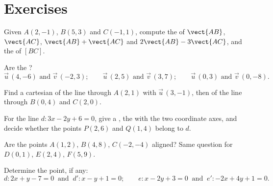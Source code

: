 \section{Exercises}

\begin{exercise}[$\star$]\label{exo:g11:vect:1}
Given $A(2, -1)$, $B(5, 3)$ and $C(-1, 1)$, compute the  of
$\vect{AB}$, $\vect{AC}$, $\vect{AB} + \vect{AC}$ and $2\vect{AB} -
3\vect{AC}$, and the  of $[BC]$.
\end{exercise}

\begin{exercise}[$\star$]\label{exo:g11:vect:2}
Are the  ?
\[
\vec u\,(4, -6) \text{ and } \vec v\,(-2, 3); \qquad
\vec u\,(2, 5) \text{ and } \vec v\,(3, 7); \qquad
\vec u\,(0, 3) \text{ and } \vec v\,(0, -8).
\]
\end{exercise}

\begin{exercise}[$\star$]\label{exo:g11:vect:3}
Find a cartesian  of the line through $A(2, 1)$ with  $\vec u\,(3, -1)$, then of the line through $B(0, 4)$ and
$C(2, 0)$.
\end{exercise}

\begin{exercise}[$\star$]\label{exo:g11:vect:4}
For the line $d: 3x - 2y + 6 = 0$, give a , the
 with the two coordinate axes, and decide whether the points
$P(2, 6)$ and $Q(1, 4)$ belong to $d$.
\end{exercise}

\begin{exercise}[$\star\star$]\label{exo:g11:vect:5}
Are the points $A(1, 2)$, $B(4, 8)$, $C(-2, -4)$ aligned? Same question
for $D(0, 1)$, $E(2, 4)$, $F(5, 9)$.
\end{exercise}

\begin{exercise}[$\star\star$]\label{exo:g11:vect:6}
Determine the  point, if any:
\[
d: 2x + y - 7 = 0 \ \text{ and }\ d': x - y + 1 = 0;
\qquad
e: x - 2y + 3 = 0 \ \text{ and }\ e': -2x + 4y + 1 = 0 .
\]
\end{exercise}

